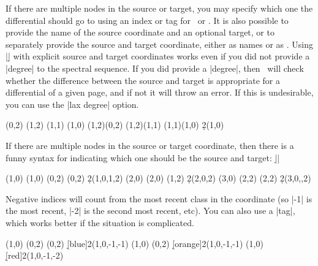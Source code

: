 \begin{sseqdata}[|| name = ex1, cohomological Serre grading]
\begin{commandlist}
If there are multiple nodes in the source or target, you may specify which one the differential should go to using an index or tag for \sourcen\  or \targetn. It is also possible to provide the name of the source coordinate and an optional target, or to separately provide the source and target coordinate, either as names or as . Using |\d| with explicit source and target coordinates works even if you did not provide a |degree| to the spectral sequence. If you did provide a |degree|, then \sseqpages\  will check whether the difference between the source and target is appropriate for a differential of a given page, and if not it will throw an error. If this is undesirable, you can use the |lax degree| option.
\begin{codeexample}[width = 7.5cm]
\begin{sseqdata}[ name = d example, degree = {-1}{#1},
                  struct lines = blue, yscale = 1.3 ]
\class(0,2)
\class(1,2)
\class(1,1)
\class(1,0)
\structline(1,2)(0,2)
\structline(1,2)(1,1)
\structline(1,1)(1,0)
\d2(1,0)
\end{sseqdata}
\printpage[ name = d example, page = 2 ] \quad
\printpage[ name = d example, page = 3 ]
\end{codeexample}
If there are multiple nodes in the source or target coordinate, then there is a funny syntax for indicating which one should be the source and target:
|\d{}|
\begin{codeexample}[width = 7.5cm]
\begin{sseqpage}[ Adams grading, yscale = 0.8 ]
\class(1,0) \class(1,0)
\class(0,2) \class(0,2)
\d2(1,0,1,2)
\class(2,0) \class(2,0)
\class(1,2)
\d2(2,0,2)
\class(3,0)
\class(2,2) \class(2,2)
\d2(3,0,,2)
\end{sseqpage}
\end{codeexample}
Negative indices will count from the most recent class in the coordinate (so |-1| is the most recent, |-2| is the second most recent, etc). You can also use a |tag|, which works better if the situation is complicated.
\begin{codeexample}[width = 7.5cm]
\begin{sseqpage}[ Adams grading, yscale = 0.65 ]
\class(1,0)
\class(0,2) \class(0,2)
\d[blue]2(1,0,-1,-1)
\class(1,0)
\class(0,2)
\d[orange]2(1,0,-1,-1)
\class(1,0)
\d[red]2(1,0,-1,-2)
\end{sseqpage}
\end{codeexample}
\end{commandlist}


\end{sseqdata}
